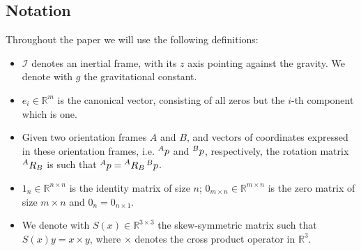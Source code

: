 \documentclass[12pt,a4paper,twoside]{article}
\begin{document}
\subsection{Notation} 
\label{sec:notation}


Throughout the paper we will use the following definitions:
\begin{itemize}
   \item $\mathcal{I}$ denotes an inertial frame, with its $z$ axis pointing against the gravity. We denote with $g$ the gravitational constant.
    \item $e_i \in \mathbb{R}^m$ is the canonical vector, consisting of all zeros but the $i$-th component which is one.
    \item Given two orientation frames $A$ and $B$, and vectors of coordinates expressed in these orientation frames, i.e. $\prescript{A}{}p$ and $\prescript{B}{}p$, respectively, the rotation matrix 
    $\prescript{A}{}R_B$ is such that $\prescript{A}{}p = \prescript{A}{}R_B  \prescript{B}{}p$. 
    \item $1_n \in \mathbb{R}^{n \times n}$ is the identity matrix of size $n$; $0_{m \times n} \in \mathbb{R}^{m \times n}$ is the zero matrix of size $m \times n$ and $0_{n } = 0_{n \times 1}$.
    \item We denote with $S(x) \in \mathbb{R}^{3 \times 3}$ the skew-symmetric matrix such that $S(x)y = x \times y$, where $\times$ denotes the cross product operator in $\mathbb{R}^3$. 
\end{itemize}
\end{document}
